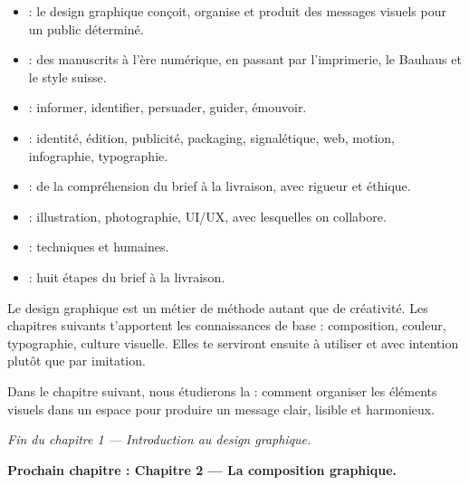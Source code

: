 \begin{itemize}
    \item {} : le design graphique conçoit, organise et produit des messages visuels pour un public déterminé.
    \item {} : des manuscrits à l'ère numérique, en passant par l'imprimerie, le Bauhaus et le style suisse.
    \item {} : informer, identifier, persuader, guider, émouvoir.
    \item {} : identité, édition, publicité, packaging, signalétique, web, motion, infographie, typographie.
    \item {} : de la compréhension du brief à la livraison, avec rigueur et éthique.
    \item {} : illustration, photographie, UI/UX, avec lesquelles on collabore.
    \item {} : techniques et humaines.
    \item {} : huit étapes du brief à la livraison.
\end{itemize}

Le design graphique est un métier de méthode autant que de créativité. Les chapitres suivants t'apportent les connaissances de base : composition, couleur, typographie, culture visuelle. Elles te serviront ensuite à utiliser  et  avec intention plutôt que par imitation.

Dans le chapitre suivant, nous étudierons la  : comment organiser les éléments visuels dans un espace pour produire un message clair, lisible et harmonieux.

\vspace{2em}

\begin{center}
\textit{Fin du chapitre 1 --- Introduction au design graphique.}

\vspace{1em}

\textbf{Prochain chapitre : Chapitre 2 --- La composition graphique.}
\end{center}

